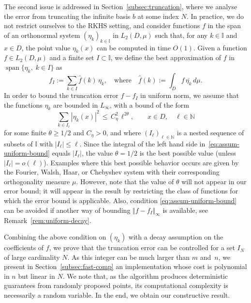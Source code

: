 \documentclass[a4paper,11pt]{article}
\renewcommand{\(}{\left (}
\renewcommand{\)}{\right )}
\newcommand{\<}{\langle}
\renewcommand{\>}{\rangle}
\newcommand{\N}{\mathbb{N}}
\newcommand{\II}{\mathbb{I}}
\theoremstyle{definition}
\DeclareMathOperator{\Span}{span}
\begin{document}
The second issue is addressed in Section~\ref{subsec:truncation}, where we analyse the error from truncating the infinite basis $b$ at some index $N$. In practice, we do not restrict ourselves to the RKHS setting, and consider functions $f$ in the span of an orthonormal system $(\eta_k)_{k\in\II}$ in 
$L_2(D,\mu)$ such that, for any $k\in \II$ and $x\in D$, the point value $\eta_k(x)$ can be computed in time $O(1)$.
Given a function $f\in L_2(D,\mu)$ and a finite set $I\subset \II$, we define 
the best approximation of $f$ in $\Span\{\eta_k,\; k\in I\}$ as
\[
 f_I := \sum_{k\in I} \hat{f}(k)\, \eta_k,
 \quad\text{where}\quad
 \hat{f}(k) := \int_D f \,\overline{\eta_k}\, d\mu.
\]
In order to bound the truncation error $f-f_I$ in uniform norm, we assume that the functions $\eta_k$ are bounded in $L_\infty$, with a bound of the form
\begin{equation}\label{eq:assum-uniform-bound}
    \sum_{k\in I_\ell} |\eta_k(x)|^2 \,\leq\, C_{\eta}^2\, \ell^{2\theta},\qquad x\in D,\quad \ell\in\N
\end{equation}
for some finite $\theta \geq 1/2$ and $C_\eta>0$, and where $(I_\ell)_{\ell\in \N}$ is a nested sequence of subsets of $\II$ with $|I_\ell|\leq \ell$. Since the integral of the left hand side in~\eqref{eq:assum-uniform-bound} equals $|I_\ell|$,
the value $\theta=1/2$ is the best possible value (unless $|I_\ell| = o(\ell)$).
Examples where this best possible behavior occurs are given by the Fourier, Walsh, Haar, or Chebyshev system with their corresponding orthogonality measure $\mu$.
However, note that the value of $\theta$ will not appear in our error bound;
it will appear in the result by restricting the class of functions for which the error bound is applicable.
Also, condition \eqref{eq:assum-uniform-bound} can be avoided if another way of bounding $\Vert f - f_I \Vert_\infty$ is available, see Remark~\ref{rem:uniform-decay}.

Combining the above condition on $(\eta_k)$ with a decay assumption on the coefficients of $f$, we prove that the truncation error can be controlled for a set $I_N$ of large cardinality $N$. As this integer can be much larger than $m$ and~$n$, we present in Section~\ref{subsec:fast-comp} an implementation whose cost is polynomial in $n$ but linear in $N$. We note that, as the algorithm produces deterministic guarantees from randomly proposed points, its computational complexity is necessarily a random variable.
In the end, we obtain our constructive result.
\end{document}
